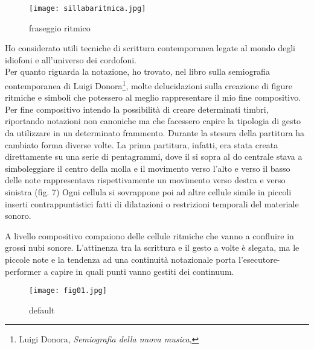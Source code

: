 
\begin{figure}[htbp]
\begin{center}
\texttt{[image: sillabaritmica.jpg]}
\caption{fraseggio ritmico}
\label{default}
\end{center}

\end{figure}

Ho considerato utili tecniche di scrittura contemporanea legate al mondo degli idiofoni e all'universo dei cordofoni. \\
Per quanto riguarda la notazione, ho trovato, nel libro sulla semiografia contemporanea di Luigi Donora\footnote{Luigi Donora, \textit{Semiografia della nuova musica}, }, molte delucidazioni sulla creazione di figure ritmiche e simboli che potessero al meglio rappresentare il mio fine compositivo. Per fine compositivo intendo la possibilità di creare determinati timbri, riportando notazioni non canoniche ma che facessero capire la tipologia di gesto da utilizzare in un determinato frammento. Durante la stesura della partitura ha cambiato forma diverse volte. La prima partitura, infatti, era stata creata direttamente su una serie di pentagrammi, dove il si sopra al do centrale stava a simboleggiare il centro della molla e il movimento verso l'alto e verso il basso delle note rappresentava rispettivamente un movimento verso destra e verso sinistra (fig. 7)
Ogni cellula si sovrappone poi ad altre cellule simile in piccoli inserti contrappuntistici fatti di dilatazioni o restrizioni temporali del materiale sonoro.

A livello compositivo compaiono delle cellule ritmiche che vanno a confluire in grossi nubi sonore. L'attinenza tra la scrittura e il gesto a volte è slegata, ma le piccole note e la tendenza ad una continuità notazionale porta l'esecutore-performer a capire in quali punti vanno gestiti dei continuum.


\begin{wrapfigure}{r}{5cm}
\centering
\texttt{[image: fig01.jpg]}
\caption{default}
\label{default}
\end{wrapfigure}

